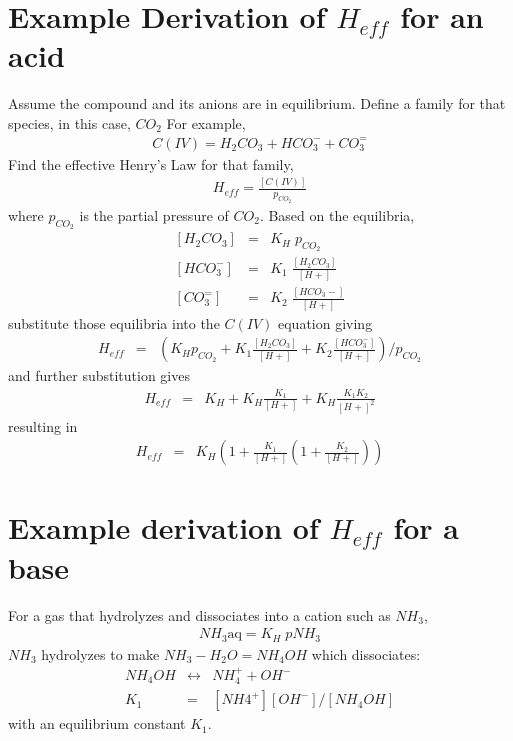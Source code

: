 \documentclass[11pt, oneside]{article}   	%
\begin{document}
\section*{Example Derivation of $H_{eff}$ for an acid}
Assume the compound and its anions are in equilibrium. 
Define a family for that species, in this case, $CO_2$
For example, 
\begin{eqnarray*}
C(IV) = H_2CO_3 + HCO_3^- + CO_3^=
\end{eqnarray*}
Find the effective Henry's Law for that family, 
\begin{eqnarray*}
H_{eff} = \frac{\left[C(IV)\right]}{p_{CO_2}}
\end{eqnarray*} 
where $p_{CO_2}$ is the partial pressure of $CO_2$. Based on the equilibria, 
\begin{eqnarray*}
\left[H_2CO_3\right] &=& K_H \; p_{CO_2}   \\[3pt]
\left[HCO_3^-\right] &=& K_1 \; \frac{\left[H_2CO_3\right]}{\left[H+\right]} \\[3pt]
\left[CO_3^=\right] &=& K_2 \; \frac{\left[HCO_3-\right]}{\left[H+\right]}
\end{eqnarray*}
substitute those equilibria into the $C(IV)$ equation giving
\begin{eqnarray*}
H_{eff} &=& \left( K_H  p_{CO_2} + K_1  \frac{[H_2CO_3]}{[H+]} + K_2  \frac{[HCO_3^-]}{[H+]} \right)/p_{CO_2}   
\end{eqnarray*}
and further substitution gives
\begin{eqnarray*}
H_{eff} &=& K_H + K_H  \frac{K_1}{\left[H+\right]} + K_H\frac{K_1 K_2}{[H+]^2} 
\end{eqnarray*}
resulting in
\begin{eqnarray*}
H_{eff} &=& K_H  \left(1+  \frac{K_1}{[H+]}  \left(1 +   \frac{K_2}{[H+]}\right)\right) 
\end{eqnarray*}

\section*{Example derivation of $H_{eff}$ for a base}
For a gas that hydrolyzes and dissociates into a cation such as $NH_3$, 
\begin{eqnarray*}
NH_3\mbox{aq} = K_H  \; pNH_3
\end{eqnarray*}
$NH_3$ hydrolyzes to make $NH_3-H_2O = NH_4OH$ which dissociates:
\begin{eqnarray*}
NH_4OH &\leftrightarrow& NH_4^+  + OH^- \\
K_1 &=&  \left[NH4^+\right]\left[OH^-\right]/\left[NH_4OH\right]
\end{eqnarray*}
with an equilibrium constant $K_1$.  
\end{document}
